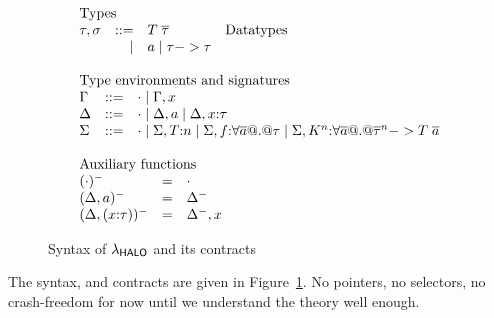 \documentclass[preprint]{sigplanconf}
\begin{document}
\begin{figure}
\[\begin{array}{l}
\begin{array}{lrll}
\multicolumn{3}{l}{\text{Types}} \\
\tau,\sigma & ::=  & T\;\taus & \text{Datatypes} \\
            & \mid & a \mid \tau -> \tau
\end{array}
\\ \\
\begin{array}{lrll}
\multicolumn{3}{l}{\text{Type environments and signatures}} \\
\Gamma & ::=  & \cdot \mid \Gamma,x \\
\Delta & ::=  & \cdot \mid \Delta,a \mid \Delta,x{:}\tau \\
\Sigma & ::=  & \cdot \mid \Sigma,T{:}n \mid \Sigma,f{:}\forall\ol{a} @.@ \tau \mid \Sigma,K^{\ar}{:}\forall\ol{a} @.@ \oln{\tau}{\ar} -> T\;\as
\end{array}
\\ \\
\begin{array}{lrll}
\multicolumn{3}{l}{\text{Auxiliary functions}} \\
(\cdot)^{-}            & = & \cdot \\
(\Delta,a)^{-}         & = & \Delta^{-} \\
(\Delta,(x{:}\tau))^{-} & = & \Delta^{-},x
\end{array}
\end{array}\]
\caption{Syntax of $\lambda_{\sf HALO}$ and its contracts}\label{fig:syntax}
\end{figure}

The syntax, and contracts are given in Figure~\ref{fig:syntax}. No
pointers, no selectors, no crash-freedom for now until we understand
the theory well enough.
\end{document}
